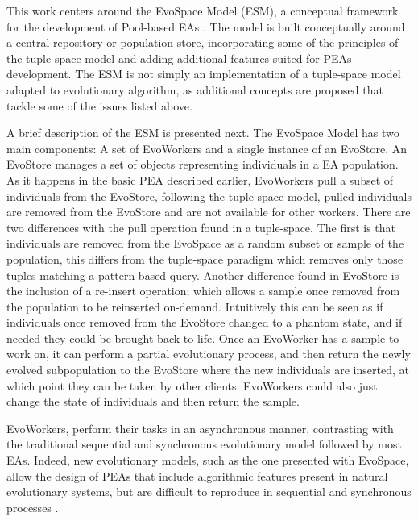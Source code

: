 This work centers around the EvoSpace Model (ESM), a conceptual framework for the development of Pool-based EAs \cite{Evospace}. The model is built conceptually around a central repository or population store, incorporating some of the principles of the tuple-space model and adding additional features suited for PEAs development. The ESM is not simply an implementation of a tuple-space model adapted to evolutionary algorithm, as additional concepts are proposed that tackle some of the issues listed above.

A brief description of the ESM is presented next.
The EvoSpace Model has two main components: A set of EvoWorkers and a single instance of an EvoStore. An EvoStore manages a set of objects representing individuals in a EA population. As it happens in the basic PEA described earlier, EvoWorkers pull a subset of individuals from the EvoStore, following the tuple space model, pulled individuals are removed from the EvoStore and are not available for other workers. There are two differences with the pull operation found in a  tuple-space. The first is that individuals are removed from the EvoSpace as a random subset or sample of the population, this differs from the tuple-space paradigm which removes only those tuples matching a pattern-based query. Another difference found in EvoStore is the inclusion of a re-insert operation; which allows a sample once removed from the population to be reinserted on-demand. Intuitively this can be seen as if individuals once removed from the EvoStore changed to a phantom state, and if needed they could be brought back to life. Once an EvoWorker has a sample to work on, it can perform a partial evolutionary process, and then return the newly evolved subpopulation to the EvoStore where the new individuals are inserted, at which point they can be taken by other clients. EvoWorkers could also just change the state of individuals and then return the sample. 

EvoWorkers, perform their tasks in an asynchronous manner, contrasting with the traditional sequential and synchronous evolutionary model followed by most EAs. Indeed, new evolutionary models, such as the one presented with EvoSpace, allow the design of PEAs that include algorithmic features present in natural evolutionary systems, but are difficult to reproduce in sequential and synchronous processes \cite{eiben}.

